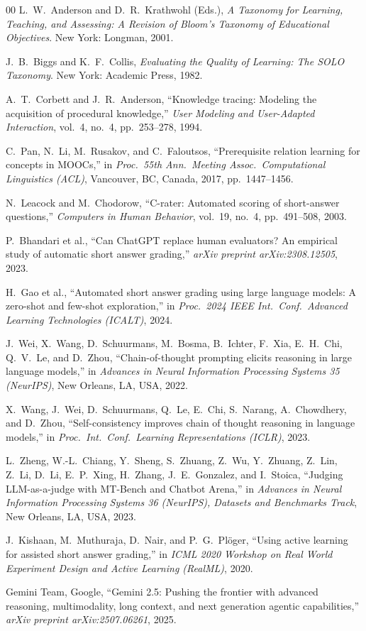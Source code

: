 \documentclass[conference]{IEEEtran}
\begin{document}
\begin{thebibliography}{00}
L.~W.~Anderson and D.~R.~Krathwohl (Eds.),
\textit{A Taxonomy for Learning, Teaching, and Assessing: A Revision of Bloom's
Taxonomy of Educational Objectives}.
New York: Longman, 2001.

J.~B.~Biggs and K.~F.~Collis,
\textit{Evaluating the Quality of Learning: The SOLO Taxonomy}.
New York: Academic Press, 1982.

A.~T.~Corbett and J.~R.~Anderson,
``Knowledge tracing: Modeling the acquisition of procedural knowledge,''
\textit{User Modeling and User-Adapted Interaction}, vol.~4, no.~4,
pp.~253--278, 1994.

C.~Pan, N.~Li, M.~Rusakov, and C.~Faloutsos,
``Prerequisite relation learning for concepts in MOOCs,''
in \textit{Proc.\ 55th Ann.\ Meeting Assoc.\ Computational Linguistics (ACL)},
Vancouver, BC, Canada, 2017, pp.~1447--1456.

N.~Leacock and M.~Chodorow,
``C-rater: Automated scoring of short-answer questions,''
\textit{Computers in Human Behavior}, vol.~19, no.~4,
pp.~491--508, 2003.

P.~Bhandari et al.,
``Can ChatGPT replace human evaluators? An empirical study of automatic
short answer grading,''
\textit{arXiv preprint arXiv:2308.12505}, 2023.

H.~Gao et al.,
``Automated short answer grading using large language models: A zero-shot
and few-shot exploration,''
in \textit{Proc.\ 2024 IEEE Int.\ Conf.\ Advanced Learning Technologies (ICALT)},
2024.

J.~Wei, X.~Wang, D.~Schuurmans, M.~Bosma, B.~Ichter, F.~Xia, E.~H.~Chi,
Q.~V.~Le, and D.~Zhou,
``Chain-of-thought prompting elicits reasoning in large language models,''
in \textit{Advances in Neural Information Processing Systems 35 (NeurIPS)},
New Orleans, LA, USA, 2022.

X.~Wang, J.~Wei, D.~Schuurmans, Q.~Le, E.~Chi, S.~Narang, A.~Chowdhery,
and D.~Zhou,
``Self-consistency improves chain of thought reasoning in language models,''
in \textit{Proc.\ Int.\ Conf.\ Learning Representations (ICLR)}, 2023.

L.~Zheng, W.-L.~Chiang, Y.~Sheng, S.~Zhuang, Z.~Wu, Y.~Zhuang, Z.~Lin,
Z.~Li, D.~Li, E.~P.~Xing, H.~Zhang, J.~E.~Gonzalez, and I.~Stoica,
``Judging LLM-as-a-judge with MT-Bench and Chatbot Arena,''
in \textit{Advances in Neural Information Processing Systems 36 (NeurIPS),
Datasets and Benchmarks Track}, New Orleans, LA, USA, 2023.

J.~Kishaan, M.~Muthuraja, D.~Nair, and P.~G.~Plöger,
``Using active learning for assisted short answer grading,''
in \textit{ICML 2020 Workshop on Real World Experiment Design and Active
Learning (RealML)}, 2020.

Gemini Team, Google,
``Gemini 2.5: Pushing the frontier with advanced reasoning, multimodality,
long context, and next generation agentic capabilities,''
\textit{arXiv preprint arXiv:2507.06261}, 2025.

\end{thebibliography}
\end{document}
